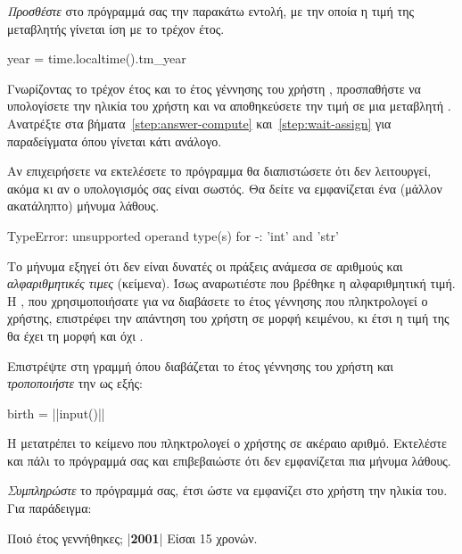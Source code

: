 \documentclass[a4paper,11pt,oneside]{book}
\begin{document}
\begin{step}
\emph{Προσθέστε} στο πρόγραμμά σας την παρακάτω εντολή, με την οποία η τιμή της μεταβλητής  γίνεται ίση με το τρέχον έτος.

\begin{pynew}
year = time.localtime().tm_year
\end{pynew}
\end{step}

\begin{step}
Γνωρίζοντας το τρέχον έτος  και το έτος γέννησης του χρήστη , προσπαθήστε να υπολογίσετε την ηλικία του χρήστη και να αποθηκεύσετε την τιμή σε μια μεταβλητή . Aνατρέξτε στα βήματα~\ref{step:answer-compute} και~\ref{step:wait-assign} για παραδείγματα όπου γίνεται κάτι ανάλογο. 

\marginnote[18pt]{\iconcaution}
Αν επιχειρήσετε να εκτελέσετε το πρόγραμμα θα διαπιστώσετε ότι δεν λειτουργεί, ακόμα κι αν ο υπολογισμός σας είναι σωστός. Θα δείτε να εμφανίζεται ένα (μάλλον ακατάληπτο) μήνυμα λάθους.
 
\begin{pyterm}
TypeError: unsupported operand type(s) for -:
  'int' and 'str'
\end{pyterm}

Το μήνυμα εξηγεί ότι δεν είναι δυνατές οι πράξεις ανάμεσα σε αριθμούς και \emph{αλφαριθμητικές τιμες} (κείμενα). Ίσως αναρωτιέστε που βρέθηκε η αλφαριθμητική τιμή. Η , που χρησιμοποιήσατε για να διαβάσετε το έτος γέννησης που πληκτρολογεί ο χρήστης, επιστρέφει την απάντηση του χρήστη σε μορφή κειμένου, κι έτσι η τιμή της  θα έχει τη μορφή  και όχι .
\end{step}

\begin{step}
Επιστρέψτε στη γραμμή όπου διαβάζεται το έτος γέννησης του χρήστη και \emph{τροποποιήστε} την ως εξής:

\begin{pyplain}
birth = ||input()|\pyhighlight{)}|
\end{pyplain}

H  μετατρέπει το κείμενο που πληκτρολογεί ο χρήστης σε ακέραιο αριθμό. Εκτελέστε και πάλι το πρόγραμμά σας και επιβεβαιώστε ότι δεν εμφανίζεται πια μήνυμα λάθους.
\end{step}

\begin{step}
\emph{Συμπληρώστε} το πρόγραμμά σας, έτσι ώστε να εμφανίζει στο χρήστη την ηλικία του. Για παράδειγμα:

\marginnote[24pt]{\iconcomputer\hspace{1ex}\iconkeyboard}
\begin{pyterm}
Ποιό έτος γεννήθηκες;
|\textbf{2001}|
Είσαι 15 χρονών.
\end{pyterm}
\end{step}
\end{document}

